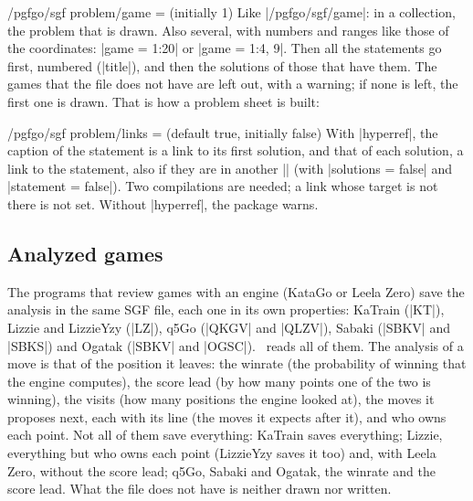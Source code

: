 \begin{key}{/pgfgo/sgf problem/game =  (initially 1)}
	Like |/pgfgo/sgf/game|: in a collection, the problem that is drawn. Also several, with numbers and ranges like those of the coordinates: |game = 1:20| or |game = {1:4, 9}|. Then all the statements go first, numbered (|title|), and then the solutions of those that have them. The games that the file does not have are left out, with a warning; if none is left, the first one is drawn. That is how a problem sheet is built:

	\begin{codeexample}
	\end{codeexample}
\end{key}

\begin{key}{/pgfgo/sgf problem/links =  (default true, initially false)}
	With |hyperref|, the caption of the statement is a link to its first solution, and that of each solution, a link to the statement, also if they are in another |\sgfproblem| (with |solutions = false| and |statement = false|). Two compilations are needed; a link whose target is not there is not set. Without |hyperref|, the package warns.

	\begin{codeexample}[]
	\end{codeexample}
\end{key}

\subsection{Analyzed games}
\label{subsec:sgfanalisis}

The programs that review games with an engine (KataGo or Leela Zero) save the analysis in the same SGF file, each one in its own properties: KaTrain (|KT|), Lizzie and LizzieYzy (|LZ|), q5Go (|QKGV| and |QLZV|), Sabaki (|SBKV| and |SBKS|) and Ogatak (|SBKV| and |OGSC|). \pgfgoname\ reads all of them. The analysis of a move is that of the position it leaves: the winrate (the probability of winning that the engine computes), the score lead (by how many points one of the two is winning), the visits (how many positions the engine looked at), the moves it proposes next, each with its line (the moves it expects after it), and who owns each point. Not all of them save everything: KaTrain saves everything; Lizzie, everything but who owns each point (LizzieYzy saves it too) and, with Leela Zero, without the score lead; q5Go, Sabaki and Ogatak, the winrate and the score lead. What the file does not have is neither drawn nor written.


